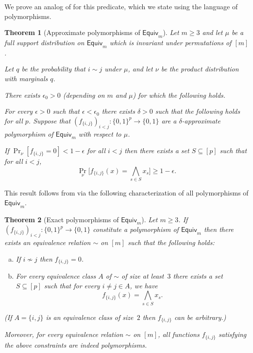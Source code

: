 \documentclass{article}
\providecommand{\Equiv}{\mathsf{Equiv}}
\newtheorem{theorem}{Theorem}[section]
\theoremstyle{definition}
\theoremstyle{remark}
\begin{document}
We prove an analog of  for this predicate, which we state using the language of polymorphisms.

\begin{theorem}[Approximate polymorphisms of $\Equiv_m$] \label{thm:main-equiv}
Let $m \ge 3$ and let $\mu$ be a full support distribution on $\Equiv_m$ which is invariant under permutations of $[m]$.

Let $q$ be the probability that $i \sim j$ under $\mu$, and let $\nu$ be the product distribution with marginals $q$. 

There exists $\epsilon_0 > 0$ (depending on $m$ and $\mu$) for which the following holds.

For every $\epsilon > 0$ such that $\epsilon < \epsilon_0$ there exists $\delta > 0$ such that the following holds for all $p$. Suppose that $(f_{\{i,j\}})_{i<j}\colon \{0,1\}^p \to \{0,1\}$ are a $\delta$-approximate polymorphism of $\Equiv_m$ with respect to $\mu$.

If $\Pr_\nu[f_{\{i,j\}}=0] < 1-\epsilon$ for all $i < j$ then there exists a set $S \subseteq [p]$ such that for all $i < j$,
\[
 \Pr_\nu\bigl[f_{\{i,j\}}(x) = \bigwedge_{s \in S} x_s\bigr] \ge 1 - \epsilon.
\]
\end{theorem}

This result follows from  via the following characterization of all polymorphisms of $\Equiv_m$.

\begin{theorem}[Exact polymorphisms of $\Equiv_m$]
\label{thm:equiv-polymorphisms}
Let $m \ge 3$. If $(f_{\{i,j\}})_{i<j}\colon \{0,1\}^p \to \{0,1\}$ constitute a polymorphism of $\Equiv_m$ then there exists an equivalence relation $\sim$ on $[m]$ such that the following holds:
\begin{enumerate}[(a)]
\item If $i \nsim j$ then $f_{\{i,j\}} = 0$.
\item For every equivalence class $A$ of $\sim$ of size at least~$3$ there exists a set $S \subseteq [p]$ such that for every $i\neq j \in A$, we have
\[
 f_{\{i,j\}}(x) = \bigwedge_{s \in S} x_s.
\]
\end{enumerate}
(If $A = \{i,j\}$ is an equivalence class of size~$2$ then $f_{\{i,j\}}$ can be arbitrary.)

Moreover, for every equivalence relation $\sim$ on $[m]$, all functions $f_{\{i,j\}}$ satisfying the above constraints are indeed polymorphisms.
\end{theorem}
\end{document}
